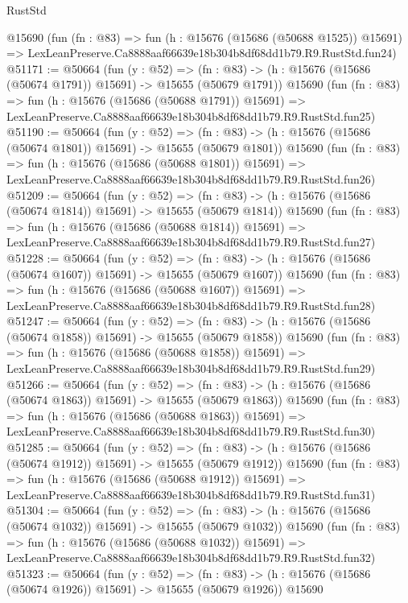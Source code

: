 \begin{lexlean}{RustStd}
\begin{coremodule}
    @15690
    (fun (fn : @83) =>
    fun (h : @15676 (@15686 (@50688 @1525)) @15691) =>
    LexLeanPreserve.Ca8888aaf66639e18b304b8df68dd1b79.R9.RustStd.fun24)
@51171 := @50664
    (fun (y : @52) =>
    (fn : @83) -> (h : @15676 (@15686 (@50674 @1791)) @15691) -> @15655 (@50679 @1791))
    @15690
    (fun (fn : @83) =>
    fun (h : @15676 (@15686 (@50688 @1791)) @15691) =>
    LexLeanPreserve.Ca8888aaf66639e18b304b8df68dd1b79.R9.RustStd.fun25)
@51190 := @50664
    (fun (y : @52) =>
    (fn : @83) -> (h : @15676 (@15686 (@50674 @1801)) @15691) -> @15655 (@50679 @1801))
    @15690
    (fun (fn : @83) =>
    fun (h : @15676 (@15686 (@50688 @1801)) @15691) =>
    LexLeanPreserve.Ca8888aaf66639e18b304b8df68dd1b79.R9.RustStd.fun26)
@51209 := @50664
    (fun (y : @52) =>
    (fn : @83) -> (h : @15676 (@15686 (@50674 @1814)) @15691) -> @15655 (@50679 @1814))
    @15690
    (fun (fn : @83) =>
    fun (h : @15676 (@15686 (@50688 @1814)) @15691) =>
    LexLeanPreserve.Ca8888aaf66639e18b304b8df68dd1b79.R9.RustStd.fun27)
@51228 := @50664
    (fun (y : @52) =>
    (fn : @83) -> (h : @15676 (@15686 (@50674 @1607)) @15691) -> @15655 (@50679 @1607))
    @15690
    (fun (fn : @83) =>
    fun (h : @15676 (@15686 (@50688 @1607)) @15691) =>
    LexLeanPreserve.Ca8888aaf66639e18b304b8df68dd1b79.R9.RustStd.fun28)
@51247 := @50664
    (fun (y : @52) =>
    (fn : @83) -> (h : @15676 (@15686 (@50674 @1858)) @15691) -> @15655 (@50679 @1858))
    @15690
    (fun (fn : @83) =>
    fun (h : @15676 (@15686 (@50688 @1858)) @15691) =>
    LexLeanPreserve.Ca8888aaf66639e18b304b8df68dd1b79.R9.RustStd.fun29)
@51266 := @50664
    (fun (y : @52) =>
    (fn : @83) -> (h : @15676 (@15686 (@50674 @1863)) @15691) -> @15655 (@50679 @1863))
    @15690
    (fun (fn : @83) =>
    fun (h : @15676 (@15686 (@50688 @1863)) @15691) =>
    LexLeanPreserve.Ca8888aaf66639e18b304b8df68dd1b79.R9.RustStd.fun30)
@51285 := @50664
    (fun (y : @52) =>
    (fn : @83) -> (h : @15676 (@15686 (@50674 @1912)) @15691) -> @15655 (@50679 @1912))
    @15690
    (fun (fn : @83) =>
    fun (h : @15676 (@15686 (@50688 @1912)) @15691) =>
    LexLeanPreserve.Ca8888aaf66639e18b304b8df68dd1b79.R9.RustStd.fun31)
@51304 := @50664
    (fun (y : @52) =>
    (fn : @83) -> (h : @15676 (@15686 (@50674 @1032)) @15691) -> @15655 (@50679 @1032))
    @15690
    (fun (fn : @83) =>
    fun (h : @15676 (@15686 (@50688 @1032)) @15691) =>
    LexLeanPreserve.Ca8888aaf66639e18b304b8df68dd1b79.R9.RustStd.fun32)
@51323 := @50664
    (fun (y : @52) =>
    (fn : @83) -> (h : @15676 (@15686 (@50674 @1926)) @15691) -> @15655 (@50679 @1926))
    @15690

\end{coremodule}
\end{lexlean}
